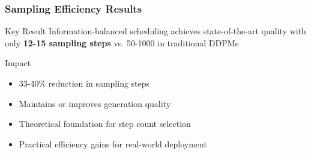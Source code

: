 \documentclass[aspectratio=169]{beamer}
\begin{document}
\begin{frame}
\frametitle{Sampling Efficiency Results}
\begin{alertblock}{Key Result}
Information-balanced scheduling achieves state-of-the-art quality with only \textbf{12-15 sampling steps} vs. 50-1000 in traditional DDPMs
\end{alertblock}

\begin{block}{Impact}
\begin{itemize}
\item \textcolor{mygreen}{33-40\% reduction} in sampling steps
\item \textcolor{mygreen}{Maintains or improves} generation quality
\item \textcolor{mygreen}{Theoretical foundation} for step count selection
\item \textcolor{mygreen}{Practical efficiency gains} for real-world deployment
\end{itemize}
\end{block}
\end{frame}
\end{document}
